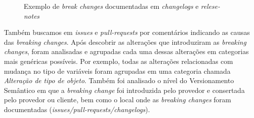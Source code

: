 \begin {figure} [h!]
{        
    }
    \caption{Exemplo de \textit{break changes} documentadas em \textit{changelogs} e \textit{relese-notes}}
    \label{fig:result_rq1_once_twice_three}
\end{figure}

Também buscamos em \textit{issues} e \textit{pull-requests} por comentários indicando as causas das \textit{breaking changes}. Após descobrir as alterações que introduziram as \textit{breaking changes}, foram analisadas e agrupadas cada uma dessas alterações em categorias mais genéricas possíveis. Por exemplo, todas as alterações relacionadas com mudança no tipo de variáveis foram agrupadas em uma categoria chamada \textit{Alteração de tipo de objeto}. Também foi analisado o nível do Versionamento Semântico em que a \textit{breaking change} foi introduzida pelo provedor e consertada pelo provedor ou cliente, bem como o local onde as \textit{breaking changes} foram documentadas (\textit{issues/pull-requests/changelogs}).

